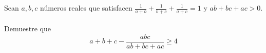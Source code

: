 Sean $a,b,c$ números reales que satisfacen $\frac{1}{a+b}+\frac{1}{b+c}+\frac{1}{a+c} =1$ y $ab+bc+ac >0$. \\\\
Demuestre que
\[ a+b+c - \frac{abc}{ab+bc+ac} \ge 4 \]

